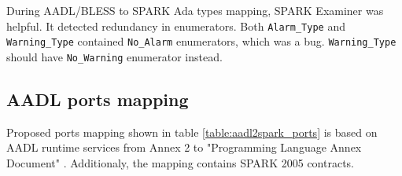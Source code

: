 During AADL/BLESS to SPARK Ada types mapping, SPARK Examiner was helpful. It detected redundancy in enumerators. Both \lstinline{Alarm_Type} and \lstinline{Warning_Type} contained \lstinline{No_Alarm} enumerators, which was a bug. \lstinline{Warning_Type} should have \lstinline{No_Warning} enumerator instead.

\subsection{AADL ports mapping}
\label{codegen:mapping:ports}

Proposed ports mapping shown in table \ref{table:aadl2spark_ports} is based on AADL runtime services from Annex 2 to "Programming Language Annex Document" \cite{AnnexDoc13}. Additionaly, the mapping contains SPARK 2005 contracts.

